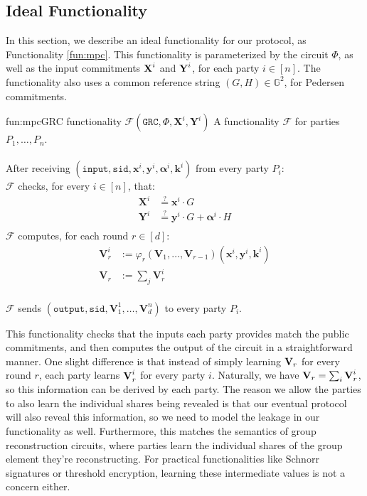 \subsection{Ideal Functionality}
\label{sec:idealfunc}
In this section, we describe an ideal functionality for our protocol,
as Functionality \ref{fun:mpc}.
This functionality is parameterized by the circuit $\Phi$,
as well as the input commitments $\textbf{X}^i$ and $\textbf{Y}^i$, for each party
$i \in [n]$.
The functionality also uses a common reference string $(G, H) \in \mathbb{G}^2$,
for Pedersen commitments.

\begin{afunctionality}{fun:mpc}{GRC functionality $\mathcal{F}(\texttt{GRC}, \Phi, \textbf{X}^i, \textbf{Y}^i)$}
A functionality $\mathcal{F}$ for parties $P_1, \ldots, P_n$.\\
\\
After receiving
$(\texttt{input}, \texttt{sid}, \textbf{x}^i, \textbf{y}^i, \boldsymbol{\alpha}^i, \textbf{k}^i)$ from every party $P_i$:\\
$\mathcal{F}$ checks, for every $i \in [n]$, that:
$$
\begin{aligned}
    \textbf{X}^i &\stackrel{?}{=} \textbf{x}^i \cdot G\\
    \textbf{Y}^i &\stackrel{?}{=} \textbf{y}^i \cdot G + \boldsymbol{\alpha}^i \cdot H\\
\end{aligned}
$$
$\mathcal{F}$ computes, for each round $r \in [d]$:
$$
\begin{aligned}
    \textbf{V}^i_{r} &:= \varphi_{r}(\textbf{V}_{1}, \ldots, \textbf{V}_{r - 1})(
        \textbf{x}^i, \textbf{y}^i, \textbf{k}^i
    )\\
    \textbf{V}_r &:= \sum_j \textbf{V}^i_r
\end{aligned}
$$\\
$\mathcal{F}$ sends $(\texttt{output}, \texttt{sid}, \textbf{V}^1_1, \ldots, \textbf{V}^n_d)$ to every party $P_i$.
\end{afunctionality}

This functionality checks that the inputs each party provides match
the public commitments, and then computes the output of the circuit
in a straightforward manner.
One slight difference is that instead of simply learning $\textbf{V}_r$ for
every round $r$, each party learns $\textbf{V}^i_r$ for every party $i$.
Naturally, we have $\textbf{V}_r = \sum_i \textbf{V}^i_r$, so this information
can be derived by each party.
The reason we allow the parties to also learn the individual shares
being revealed is that our eventual protocol will also reveal this
information, so we need to model the leakage in our functionality as well.
Furthermore, this matches the semantics of group reconstruction circuits,
where parties learn the individual shares of the group element they're
reconstructing.
For practical functionalities like Schnorr signatures or threshold encryption,
learning these intermediate values is not a concern either.

